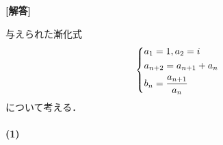 \documentclass[../../main.tex]{subfiles}
\begin{document}
\begin{oframed}
  
\end{oframed}

{\bf [解答]}

与えられた漸化式
\begin{align}
  \begin{dcases}
    a_1 = 1, a_2 = i \\
    a_{n+2} = a_{n+1} + a_n \\
    b_n = \dfrac{a_{n+1}}{a_n}
  \end{dcases} \label{eq:1}
\end{align}
について考える．

\paragraph{(1)}
\end{document}
